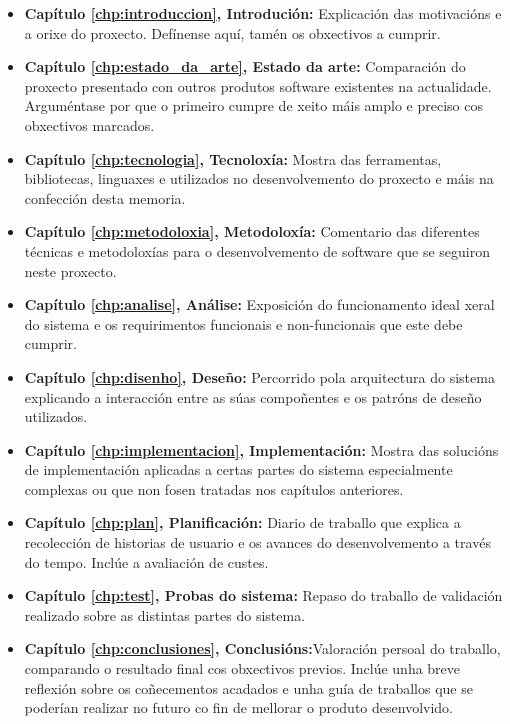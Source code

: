 \begin{itemize}
	\item \textbf{Capítulo \ref{chp:introduccion}, Introdución:} Explicación das motivacións e a orixe do proxecto. Defínense aquí, tamén os obxectivos a cumprir.
	\item \textbf{Capítulo \ref{chp:estado_da_arte}, Estado da arte:} Comparación do proxecto presentado con outros produtos software existentes na actualidade. Arguméntase por que o primeiro cumpre de xeito máis amplo e preciso cos obxectivos marcados.
	\item \textbf{Capítulo \ref{chp:tecnologia}, Tecnoloxía:} Mostra das ferramentas, bibliotecas, linguaxes e  utilizados no desenvolvemento do proxecto e máis na confección desta memoria.
	\item \textbf{Capítulo \ref{chp:metodoloxia}, Metodoloxía:} Comentario das diferentes técnicas e metodoloxías para o desenvolvemento de software que se seguiron neste proxecto.
	\item \textbf{Capítulo \ref{chp:analise}, Análise:} Exposición do funcionamento ideal xeral do sistema e os requirimentos funcionais e non-funcionais que este debe cumprir.
	\item \textbf{Capítulo \ref{chp:disenho}, Deseño:} Percorrido pola arquitectura do sistema explicando a interacción entre as súas compoñentes e os patróns de deseño utilizados.
 	\item \textbf{Capítulo \ref{chp:implementacion}, Implementación:} Mostra das solucións de implementación aplicadas a certas partes do sistema especialmente complexas ou que non fosen tratadas nos capítulos anteriores.
 	\item \textbf{Capítulo \ref{chp:plan}, Planificación:} Diario de traballo que explica a recolección de historias de usuario e os avances do desenvolvemento a través do tempo. Inclúe a avaliación de custes.
 	\item \textbf{Capítulo \ref{chp:test}, Probas do sistema:} Repaso do traballo de validación realizado sobre as distintas partes do sistema.
 	\item \textbf{Capítulo \ref{chp:conclusiones}, Conclusións:}Valoración persoal do traballo, comparando o resultado final cos obxectivos previos. Inclúe unha breve reflexión sobre os coñecementos acadados e unha guía de traballos que se poderían realizar no futuro co fin de mellorar o produto desenvolvido.
	
\end{itemize}


